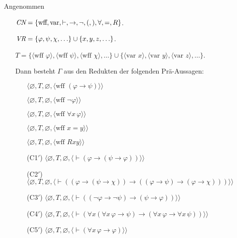 Angenommen
\begin{itemize}
  \item[] $\mbox{\em CN}=\{\mbox{wff}, \mbox{var}, \vdash, \to, \lnot, (,),\forall,=,R\}$.
  \item[] $\mbox{\em VR}=\{\varphi,\psi,\chi,\ldots\}\cup\{x,y,z,\ldots\}$.
  \item[] $T = \{\langle \mbox{wff\ } \varphi\rangle,
             \langle \mbox{wff\ } \psi\rangle,
             \langle \mbox{wff\ } \chi\rangle,\ldots\}\cup
       \{\langle \mbox{var\ } x\rangle, \langle \mbox{var\ } y\rangle, \langle
       \mbox{var\ }z\rangle,\ldots\}$.

\noindent Dann besteht $\Gamma$ aus den Redukten der folgenden Prä-Aussagen:
    \begin{itemize}
      \item[] $\langle\varnothing,T,\varnothing,
               \langle \mbox{wff\ }(\varphi\to\psi)\rangle\rangle$
      \item[] $\langle\varnothing,T,\varnothing,
               \langle \mbox{wff\ }\lnot\varphi\rangle\rangle$
      \item[] $\langle\varnothing,T,\varnothing,
               \langle \mbox{wff\ }\forall x\,\varphi\rangle\rangle$
      \item[] $\langle\varnothing,T,\varnothing,
               \langle \mbox{wff\ }x=y\rangle\rangle$
      \item[] $\langle\varnothing,T,\varnothing,
               \langle \mbox{wff\ }Rxy\rangle\rangle$
      \item[(C1$'$)] $\langle\varnothing,T,\varnothing,
               \langle \vdash(\varphi\to(\psi\to\varphi))
               \rangle\rangle$
      \item[(C2$'$)] $\langle\varnothing,T,
               \varnothing,
               \langle \vdash((\varphi\to(\psi\to\chi))\to
               ((\varphi\to\psi)\to(\varphi\to\chi)))
               \rangle\rangle$
      \item[(C3$'$)] $\langle\varnothing,T,
               \varnothing,
               \langle \vdash((\lnot\varphi\to\lnot\psi)\to
               (\psi\to\varphi))\rangle\rangle$
      \item[(C4$'$)] $\langle\varnothing,T,
               \varnothing,
               \langle \vdash(\forall x(\forall x\,\varphi\to\psi)\to
                 (\forall x\,\varphi\to\forall x\,\psi))\rangle\rangle$
      \item[(C5$'$)] $\langle\varnothing,T,
               \varnothing,
               \langle \vdash(\forall x\,\varphi\to\varphi)\rangle\rangle$

\end{itemize}
\end{itemize}
